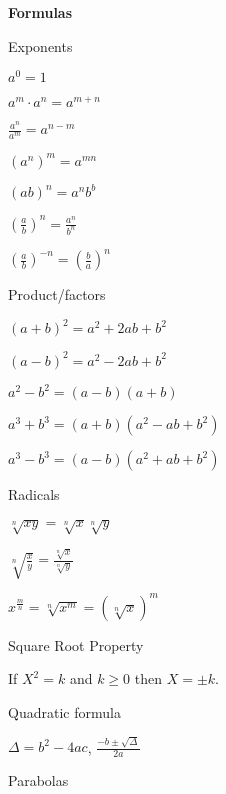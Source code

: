 \documentclass[12pt]{article}
\begin{document}
\begin{center}
  {\Large \bf Formulas}
\end{center}

\begin{multicols}{2}
  {\large Exponents}
  \begin{description}
  \item $a^0=1$
  \item $ a^m\cdot a^n = a^{m+n}$
  \item $ \frac{a^n}{a^m} = a^{n-m} $
  \item $ (a^n)^m = a^{mn} $
  \item $ (ab)^n = a^nb^b $
  \item $ \left( \frac{a}{b} \right)^n = \frac{a^n}{b^n}$
  \item $ \left(\frac{a}{b}\right)^{-n} = \left(\frac{b}{a}\right)^n $
  \end{description}
    
  {\large Product/factors}
  \begin{description}
  \item $(a+b)^2 = a^2 + 2ab + b^2$
  \item $(a-b)^2 = a^2 - 2ab + b^2  $
  \item $ a^2 - b^2 = (a-b)(a+b) $
  \item $ a^3 + b^3 = (a+b)(a^2 - ab + b^2) $
  \item $ a^3 - b^3 = (a-b)(a^2 + ab + b^2) $
  \end{description}
  
  {\large Radicals}
  \begin{description}
  \item $ \sqrt[n]{xy} = \sqrt[n]{x}\sqrt[n]{y}$
  \item $\sqrt[n]{\frac{x}{y}} = \frac{\sqrt[n]{x}}{\sqrt[n]{y}}$
  \item $ x^{\frac{m}{n}} = \sqrt[n]{x^m} = (\sqrt[n]{x})^m $
  \end{description}

  {\large Square Root Property}
  
  If $X^2 = k$ and $k \geq 0$ then $X = \pm k$.

  \vspace{.25in}
  {\large Quadratic formula}

  $\Delta = b^2 -4ac$, $\displaystyle \frac{-b\pm\sqrt{\Delta}}{2a}$

  \vspace{.25in}
  {\large{Parabolas}}


\end{multicols}
\end{document}
